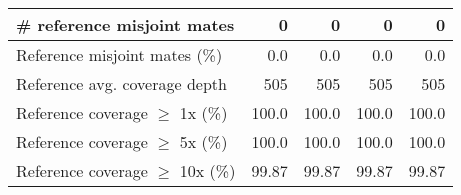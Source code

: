 \documentclass[12pt,a4paper]{article}
\begin{document}
\begin{table}[ht]
\begin{center}
\begin{tabular}{|l*{4}{|r}|}
\# reference misjoint mates & 0 & 0 & 0 & 0 \\ \hline
Reference misjoint mates (\%) & 0.0 & 0.0 & 0.0 & 0.0 \\ \hline
Reference avg. coverage depth & 505 & 505 & 505 & 505 \\ \hline
Reference coverage $\geq$ 1x (\%) & 100.0 & 100.0 & 100.0 & 100.0 \\ \hline
Reference coverage $\geq$ 5x (\%) & 100.0 & 100.0 & 100.0 & 100.0 \\ \hline
Reference coverage $\geq$ 10x (\%) & 99.87 & 99.87 & 99.87 & 99.87 \\ \hline
\end{tabular}
\end{center}
\end{table}
\end{document}
